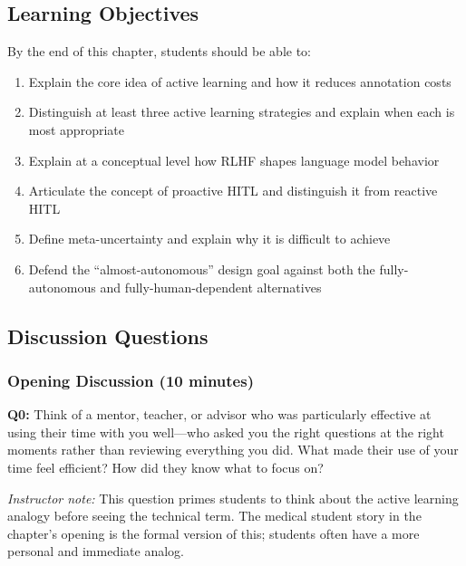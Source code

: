 \subsection*{Learning Objectives}

By the end of this chapter, students should be able to:

\begin{enumerate}
    \item Explain the core idea of active learning and how it reduces annotation costs
    \item Distinguish at least three active learning strategies and explain when each is most appropriate
    \item Explain at a conceptual level how RLHF shapes language model behavior
    \item Articulate the concept of proactive HITL and distinguish it from reactive HITL
    \item Define meta-uncertainty and explain why it is difficult to achieve
    \item Defend the ``almost-autonomous'' design goal against both the fully-autonomous and fully-human-dependent alternatives
\end{enumerate}

\subsection*{Discussion Questions}

\subsubsection*{Opening Discussion (10 minutes)}

\textbf{Q0:} Think of a mentor, teacher, or advisor who was particularly effective at using their time with you well---who asked you the right questions at the right moments rather than reviewing everything you did. What made their use of your time feel efficient? How did they know what to focus on?

\textit{Instructor note:} This question primes students to think about the active learning analogy before seeing the technical term. The medical student story in the chapter's opening is the formal version of this; students often have a more personal and immediate analog.


